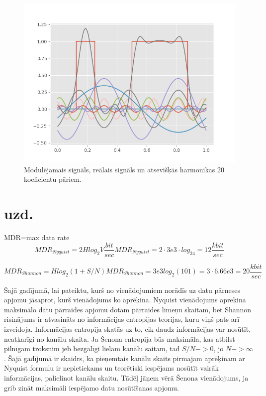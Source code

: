 \documentclass[a4paper,11pt]{article}
\begin{document}
\begin{figure}
\centering
\includegraphics[scale=0.7]{Fig10x.png}
\caption{Modulējamais signāls, reālais signāls un atsevišķās harmonikas 20 koeficientu pāriem.}
\label{fig2}
\end{figure}


\FloatBarrier
\section{ uzd.}
MDR=max data rate
\begin{equation}
MDR_{Nyquist}=2Hlog_2V \frac{bit}{sec}
MDR_{Nyquist}=2\cdot 3e3\cdot log_24=12 \frac{kbit}{sec}
\end{equation}

\begin{equation}
MDR_{Shannon}=Hlog_2(1+S/N)
MDR_{Shannon}=3e3log_2(101)=3\cdot 6.66e3=20 \frac{kbit}{sec}
\end{equation}

Šajā gadījumā, lai pateiktu, kurš no vienādojumiem norādīs uz datu pārneses apjomu jāsaprot, kurš vienādojums ko aprēķina. Nyquist vienādojums apreķina maksimālo datu pārraides apjomu dotam pārraides līmeņu skaitam, bet Shannon risinājums ir atvasināts no informācijas entropijas teorijas, kuru viņš pats arī izveidoja. Informācijas entropija skatās uz to, cik daudz informācijas var nosūtīt, neatkarīgi no kanālu skaita. Ja Šenona entropija būs maksimāla, kas atbilst pilnīgam troksnim jeb bezgalīgi lielam kanālu saitam, tad $S/N->0$, jo $N->\infty$. Šajā gadījumā ir skaidrs, ka pieņemtais kanālu skaits pirmajam aprēķinam ar Nyquist formulu ir nepietiekams un teorētiski iespējams nosūtīt vairāk informācijas, palielinot kanālu skaitu. Tādēļ jāņem vērā Šenona vienādojums, ja grib zināt maksimāli iespējamo datu nosūtīšanas apjomu.
\end{document}
